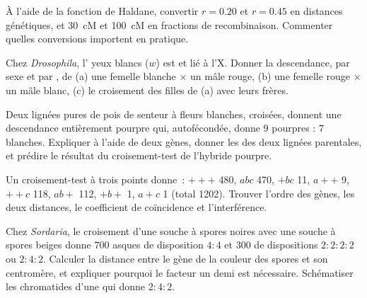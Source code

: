 \begin{exercise}[$\star\star$]\label{exo:b2:meiosis-heredity:7}
À l'aide de la fonction de Haldane, convertir $r = 0.20$ et $r = 0.45$
en distances génétiques, et \qty{30}{cM} et \qty{100}{cM} en fractions
de recombinaison. Commenter quelles conversions importent en pratique.
\end{exercise}

\begin{exercise}[$\star\star$]\label{exo:b2:meiosis-heredity:8}
Chez \emph{Drosophila}, l' yeux blancs ($w$) est  et lié
à l'X. Donner la descendance, par sexe et par , de (a) une
femelle blanche $\times$ un mâle rouge, (b) une femelle rouge
 $\times$ un mâle blanc, (c) le croisement des filles
de (a) avec leurs frères.
\end{exercise}

\begin{exercise}[$\star\star$]\label{exo:b2:meiosis-heredity:9}
Deux lignées pures de pois de senteur à fleurs blanches, croisées,
donnent une descendance entièrement pourpre qui, autofécondée, donne
$9$ pourpres : $7$ blanches.
Expliquer à l'aide de deux gènes, donner les  des deux lignées
parentales, et prédire le résultat du croisement-test de l'hybride
pourpre.
\end{exercise}

\begin{exercise}[$\star\star\star$]\label{exo:b2:meiosis-heredity:10}
Un croisement-test à trois points donne~: $+++$ 480, $abc$ 470, $+bc$ 11,
$a++$ 9, $++c$ 118, $ab+$ 112, $+b+$ 1, $a+c$ 1 (total 1202). Trouver
l'ordre des gènes, les deux distances, le coefficient de coïncidence et
l'interférence.
\end{exercise}

\begin{exercise}[$\star\star\star$]\label{exo:b2:meiosis-heredity:11}
Chez \emph{Sordaria}, le croisement d'une souche à spores noires avec
une souche à spores beiges donne $700$ asques de disposition $4 : 4$ et
$300$ de dispositions $2 : 2 : 2 : 2$ ou $2 : 4 : 2$. Calculer la
distance entre le gène de la couleur des spores et son centromère, et
expliquer pourquoi le facteur un demi est nécessaire. Schématiser les
chromatides d'une  qui donne
$2 : 4 : 2$.
\end{exercise}

